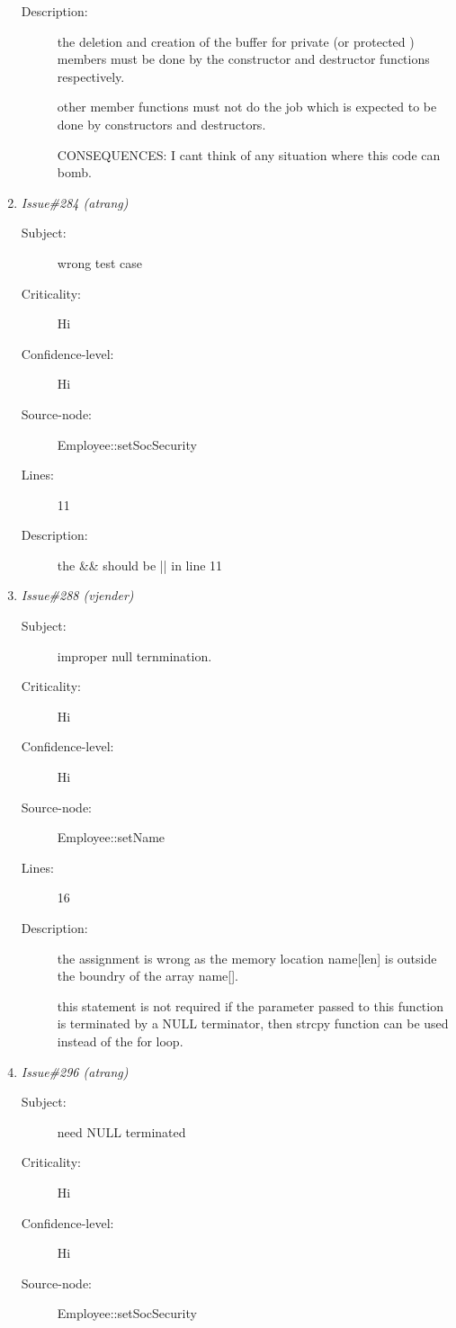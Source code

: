 \begin{enumerate}
\begin{description}
\item [Description:] the deletion and creation of the buffer for 
private (or protected ) members must be done by the constructor and
destructor functions respectively.

other member functions must not do the job which is expected to be done by
constructors and destructors.


CONSEQUENCES: I cant think of any situation where this code can bomb.
\end{description}
\item {\it Issue\#284 (atrang)}
\begin{description}
\item [Subject:] wrong test case
\item [Criticality:] Hi
\item [Confidence-level:] Hi
\item [Source-node:] Employee::setSocSecurity

\item [Lines:] 11

\item [Description:] the \&\& should be || in line 11
\end{description}
\item {\it Issue\#288 (vjender)}
\begin{description}
\item [Subject:] improper null ternmination.
\item [Criticality:] Hi
\item [Confidence-level:] Hi
\item [Source-node:] Employee::setName

\item [Lines:] 16

\item [Description:] the assignment is wrong as the memory location
name[len] is outside the boundry of the array name[].

this statement is not required if the parameter passed to this function is
terminated by a NULL terminator, then strcpy function can be used instead of
the for loop.
\end{description}
\item {\it Issue\#296 (atrang)}
\begin{description}
\item [Subject:] need NULL terminated
\item [Criticality:] Hi
\item [Confidence-level:] Hi
\item [Source-node:] Employee::setSocSecurity


\end{description}
\end{enumerate}
